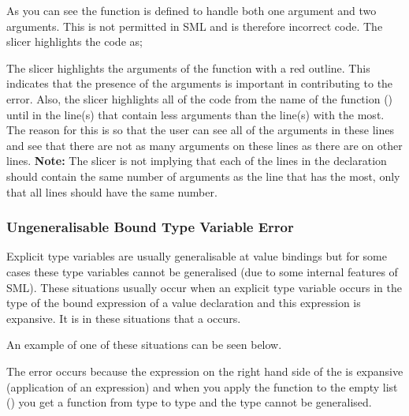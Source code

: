 \documentclass{report}
\begin{document}
\begin{itemize}
As you can see the function  is defined to handle
both one argument and two arguments. This is not permitted in SML and
is therefore incorrect code. The slicer highlights the code as;

The slicer highlights the arguments of the function with a red
outline. This indicates that the presence of the arguments is
important in contributing to the error. Also, the slicer highlights
all of the code from the name of the function ()
until \incodebody{=} in the line(s) that contain less arguments
than the line(s) with the most. The reason for this is so that the
user can see all of the arguments in these lines and see that there
are not as many arguments on these lines as there are on other lines.
\textbf{Note:} The slicer is not implying that each of the lines in
the declaration should contain the same number of arguments as the
line that has the most, only that all lines should have the same number.


\subsubsection{Ungeneralisable Bound Type Variable Error}

\subitem Explicit type variables are usually generalisable at value
bindings but for some cases these type variables cannot be generalised
(due to some internal features of SML). These situations usually occur
when an explicit type variable occurs in the type of the bound
expression of a value declaration and this expression is expansive. It is
in these situations that a  occurs.

An example of one of these situations can be seen below.


The error occurs because the expression on the right hand side of the
\incodebody{=} is expansive (application of an  expression) and when you apply the function
 to the empty list (\incodebody{[]}) you get a function
from type  to type  and the type
 cannot be generalised.


\end{itemize}
\end{document}
